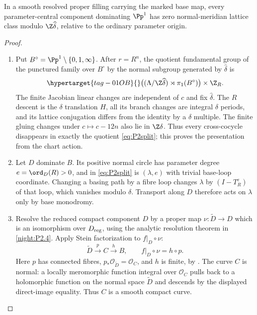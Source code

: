 \begin{theorem}\hypertarget{tag-02RG}{}\label{night:P2.6}\label{stmt:P2.6}

In a smooth resolved proper filling carrying the marked base map, every parameter-central component dominating $\Pp^1$ has zero normal-meridian lattice class modulo $\Z\widehat\delta$, relative to the ordinary parameter origin.
\end{theorem}
\begin{proof}
\begin{enumerate}[label=\arabic*.,leftmargin=*]
\item Put $B^\circ=\Pp^1\setminus\{0,1,\infty\}$. After $r=R^n$, the quotient fundamental group of the punctured family over $B^\circ$ by the normal subgroup generated by $\widehat\delta$ is
\begin{equation}\hypertarget{tag-01OB}{}\label{eq:P2split}
 \bigl((\Lambda/\Z\widehat\delta)\rtimes\pi_1(B^\circ)\bigr)\times\Z_R.
\end{equation}
The finite Jacobian linear changes are independent of $c$ and fix $\widehat\delta$. The $R$ descent is the $\delta$ translation $H$, all its branch changes are integral $\delta$ periods, and its lattice conjugation differs from the identity by a $\delta$ multiple. The finite gluing changes under $c\mapsto c-12n$ also lie in $\Z\delta$. Thus every cross-cocycle disappears in exactly the quotient \eqref{eq:P2split}; this proves the presentation from the chart action.

\item Let $D$ dominate $B$. Its positive normal circle has parameter degree $e=\ord_D(R)>0$, and in \eqref{eq:P2split} is $(\lambda,e)$ with trivial base-loop coordinate. Changing a basing path by a fibre loop changes $\lambda$ by $(I-T_R^e)$ of that loop, which vanishes modulo $\delta$. Transport along $D$ therefore acts on $\lambda$ only by base monodromy.

\item Resolve the reduced compact component $D$ by a proper map
$\nu:\widetilde D\to D$ which is an isomorphism over $D_{\rm reg}$,
using the analytic resolution theorem in \ref{night:P2.4}.
Apply Stein factorization to $f|_D\circ\nu$:
\[
 \widetilde D\xrightarrow{p} C\xrightarrow{h} B,
 \qquad f|_D\circ\nu=h\circ p.
\]
Here $p$ has connected fibres, $p_*\mathcal O_{\widetilde D}=\mathcal O_C$,
and $h$ is finite, by \cite[Theorem~8.5, pp.~80--81]{Movasati24}.
The curve $C$ is normal: a locally meromorphic function integral over
$\mathcal O_C$ pulls back to a holomorphic function on the normal space
$\widetilde D$ and descends by the displayed direct-image equality.
Thus $C$ is a smooth compact curve.


\end{enumerate}
\end{proof}
